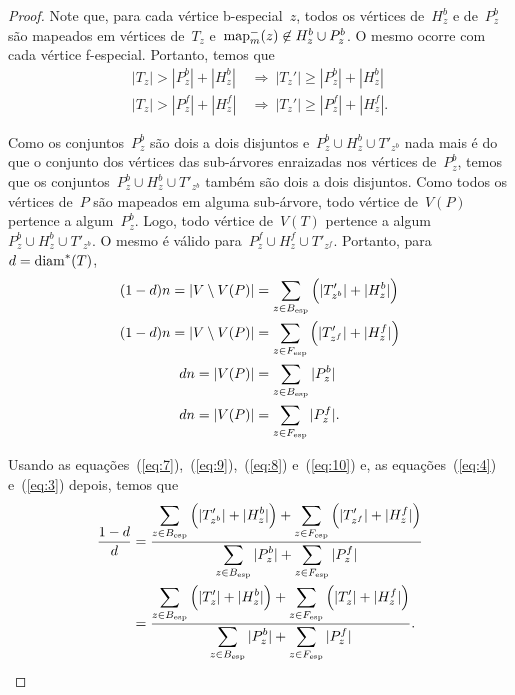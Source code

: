 \begin{proof}
	Note que, para cada vértice b-especial~$z$, todos os vértices 
	de~$H^b_z$ e de~$P^b_z$ são mapeados em vértices de~$T_z$ 
	e~$\mathrm{map}^-_m(z)\not\in H^b_z\cup P_z^b$.
	O mesmo ocorre com cada vértice f-especial.
	Portanto, temos que
	\begin{align}
		|T_z| > |P^b_z| + |H^b_z| 
		\ &\Rightarrow \
		|T_z'| \ge |P^b_z| + |H^b_z| \label{eq:5}\\
		|T_z| > |P^f_z| + |H^f_z|
		\ &\Rightarrow \
		|T_z'| \ge |P^f_z| + |H^f_z| \label{eq:6}.
	\end{align}

	Como os conjuntos~$P^b_z$ são dois a dois disjuntos 
	e~$P^b_z\cup H^b_z\cup T'_{z^b}$
	nada mais é do que o conjunto dos vértices das sub-árvores enraizadas
	nos vértices de~$P^b_z$, temos 
	que os conjuntos~${P^b_z\cup H^b_z\cup T'_{z^b}}$ também são 
	dois a dois disjuntos.
	Como todos os vértices de~$P$ são mapeados em alguma sub-árvore,
	todo vértice de~$V(P)$ pertence a algum~$P^b_z$.
	Logo,
	todo vértice de~$V(T)$ pertence a 
	algum~${P^b_z\cup H^b_z\cup T'_{z^b}}$.
	O mesmo é válido para~${P^f_z\cup H^f_z\cup T'_{z^f}}$.
	Portanto, para~$d = \mathrm{diam}^*(T)$,
	\begin{align}
		(1-d)n = |V\setminus V(P)| &= 
		\displaystyle\sum_{z\in B_{\mathrm{esp}}}\Big(|T_{z^b}'|+|H_z^b|\Big)
		\label{eq:7}\\
		(1-d)n = |V\setminus V(P)| &= 
		\displaystyle\sum_{z\in F_{\mathrm{esp}}}\Big(|T_{z^f}'|+|H_z^f|\Big)
		\label{eq:9}\\
		dn = |V(P)| &= 
		\displaystyle\sum_{z\in B_{\mathrm{esp}}}|P_z^b|
		\label{eq:8}\\
		dn = |V(P)| &= 
		\displaystyle\sum_{z\in F_{\mathrm{esp}}}|P_z^f| 
		\label{eq:10}.
	\end{align}

	Usando as equações~(\ref{eq:7}),~(\ref{eq:9}),~(\ref{eq:8}) e~(\ref{eq:10})
	e, as equações~(\ref{eq:4}) e~(\ref{eq:3}) depois, temos que
	\begin{align}
		\dfrac{1-d}{d} &= 
		\dfrac{
			\displaystyle\sum_{z\in B_{\mathrm{esp}}}
			\Big(|T'_{z^b}|+|H_z^b|\Big) + 
			\displaystyle\sum_{z\in F_{\mathrm{esp}}}
			\Big(|T'_{z^f}|+|H_z^f|\Big)}
			{\displaystyle\sum_{z\in B_{\mathrm{esp}}}|P_z^b| +
			\displaystyle\sum_{z\in F_{\mathrm{esp}}}|P_z^f|}
			\nonumber\\
		&= \dfrac{
			\displaystyle\sum_{z\in B_{\mathrm{esp}}}
			\Big(|T'_{z}|+|H_z^b|\Big) + 
			\displaystyle\sum_{z\in F_{\mathrm{esp}}}
			\Big(|T'_{z}|+|H_z^f|\Big)}
			{\displaystyle\sum_{z\in B_{\mathrm{esp}}}|P_z^b| +
			\displaystyle\sum_{z\in F_{\mathrm{esp}}}|P_z^f|}.
			\nonumber
	\end{align}
			

\end{proof}
